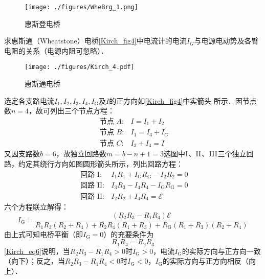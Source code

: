 

\begin{figure}[ht]
\centering
\texttt{[image: ./figures/WheBrg\_1.png]}
\caption{惠斯登电桥} \label{WheBrg_fig1}
\end{figure}

求惠斯通（Wheatstone）电桥\autoref{Kirch_fig4}中电流计的电流$I_G$与电源电动势及各臂电阻的关系（电源内阻可忽略）．
\begin{figure}[ht]
\centering
\texttt{[image: ./figures/Kirch\_4.pdf]}
\caption{惠斯通电桥} \label{Kirch_fig4}
\end{figure}

选定各支路电流$I_{1}, I_{2}, I_{3}, I_{4}, I_{\mathrm{G}}$及$I $的正方向如\autoref{Kirch_fig4}中实箭头
所示．因节点数$n = 4$，故可列出三个节点方程：
\begin{equation}
\begin{array}{ll}\text { 节点 } A: & I=I_{1}+I_{2} \\ \text { 节点 } B: & I_{1}=I_{3}+I_{G} \\ \text { 节点 } C: & I_{3}+I_{4}=I\end{array}
\end{equation}
又因支路数$b=6$，故独立回路数$m=b-n+1=3$选图中$\rm I$、$\rm II$、$\rm III$三个独立回路，约定其绕行方向如图圆形箭头所示，列出回路方程：
\begin{equation}
\begin{array}{ll}\text { 回路 } \mathrm{I}: & I_{1} R_{1}+I_{\mathrm{G}} R_{\mathrm{G}}-I_{2} R_{2}=0 \\ \text { 回路 } \mathrm{II}: & I_{3} R_{3}-I_{4} R_{4}-I_{\mathrm{G}} R_{\mathrm{G}}=0 \\ \text { 回路 } \mathrm{II}  : & I_{2} R_{2}+I_{4} R_{4}=\mathscr{E}\end{array}
\end{equation}
六个方程联立解得：
\begin{equation} \label{Kirch_eq6}
I_{\mathrm{G}}=\frac{\left(R_{2} R_{3}-R_{1} R_{4}\right) \mathscr{E}}{{R}_{1} R_{3}\left(R_{2}+R_{4}\right)+R_{2} R_{4}\left(R_{1}+R_{3}\right)+R_{\mathrm{G}}\left(R_{1}+R_{3}\right)\left(R_{2}+R_{4}\right)}
\end{equation}
由上式可知电桥平衡（即$I_\mathrm{G} = 0$）的充要条件为
\begin{equation}
R_{1} R_{4}=R_{2} R_{3}
\end{equation}
\autoref{Kirch_eq6}说明，当$R_{2} R_{3}-R_{1} R_{4}>0$时$I_{\mathrm{G}}>0$，电流$I_{\mathrm{G}}$的实际方向与正方向一致（向下）；反之，当$R_{2} R_{3}-R_{1} R_{4}<0$时$I_{\mathrm{G}}<0$，$I_{\mathrm{G}}$的实际方向与正方向相反（向上）．
